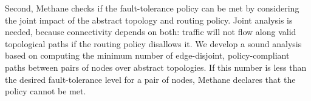 \documentclass[numbers, 10pt, preprint]{sigplanconf}
\newcommand{\ryan}[1]{\textcolor{green}{[ryan: #1]}}
\newcommand{\sysname}{{\small \sf Methane}\xspace}
\begin{document}
Second, \sysname checks if the fault-tolerance policy can be met by considering the joint impact of the abstract topology and routing policy. Joint analysis is needed, because connectivity depends on both: traffic will not flow along
valid topological paths if the routing policy disallows it.
%
We develop a sound analysis based on computing the minimum
number of edge-disjoint, policy-compliant paths between pairs of nodes
over abstract topologies. If this number is less
than the desired fault-tolerance level for a pair of nodes, \sysname declares that the
policy cannot be met.

%
\end{document}
